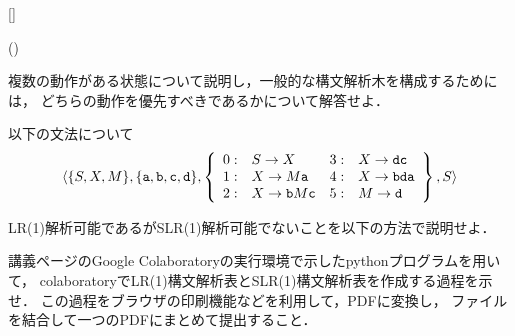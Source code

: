 \documentclass[dvipdfmx]{jarticle}
\newcounter{coffee}
\newcounter{bean}
\begin{document}
\begin{list}{[]}{}
\begin{list}{()}{}
            \item 複数の動作がある状態について説明し，一般的な構文解析木を構成するためには，
                どちらの動作を優先すべきであるかについて解答せよ．
        \end{list}
    \item 以下の文法について
             \[\langle\{S,X,M\},\{\texttt{a},\texttt{b},\texttt{c},\texttt{d}\},\left\{
            \begin{array}{clcl}
                0: & S\rightarrow X         & 3: & X\rightarrow \verb|d|\verb|c| \\
                1: & X\rightarrow M \verb|a| & 4: & X\rightarrow\verb|b|\verb|d|\verb|a|\\
                2: & X\rightarrow \verb|b|M\verb|c|         & 5: & M\rightarrow\verb|d|
            \end{array}\right\},S\rangle\]

        LR(1)解析可能であるがSLR(1)解析可能でないことを以下の方法で説明せよ．

        講義ページのGoogle Colaboratoryの実行環境で示したpythonプログラムを用いて，
        colaboratoryでLR(1)構文解析表とSLR(1)構文解析表を作成する過程を示せ．
        この過程をブラウザの印刷機能などを利用して，PDFに変換し，
        ファイルを結合して一つのPDFにまとめて提出すること．
\end{list}
\end{document}
